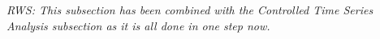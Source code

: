 \documentclass{ametsoc}
\begin{document}
\emph{RWS: This subsection has been combined with the Controlled Time Series Analysis subsection as it is all done in one step now.}

\end{document}

